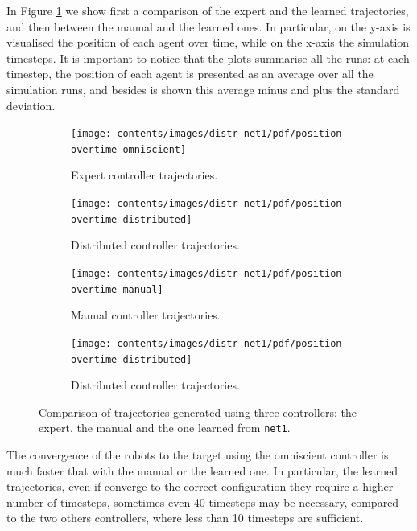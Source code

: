 In Figure \ref{fig:net1traj} we show first a comparison of the expert and the 
learned trajectories, and then between the manual and the learned ones. In 
particular, on the y-axis is visualised the position of each agent over time, while 
on the x-axis the simulation timesteps. It is important to notice that the plots 
summarise all the runs: at each timestep, the position of each agent is presented 
as an average over all the simulation runs, and besides is shown this average 
minus and plus the standard deviation.
\begin{figure}[!htb]
	\centering
	\begin{subfigure}[h]{0.49\textwidth}
		\centering
		\texttt{[image: contents/images/distr-net1/pdf/position-overtime-omniscient]}%
		\caption{Expert controller trajectories.}
	\end{subfigure}
	\hfill
	\begin{subfigure}[h]{0.49\textwidth}
		\centering
		\texttt{[image: contents/images/distr-net1/pdf/position-overtime-distributed]}
		\caption{Distributed controller trajectories.}
	\end{subfigure}
	\hspace*{\fill}%
	
	\vspace*{8pt}%
	
	\hspace*{\fill}%
	\begin{subfigure}[h]{0.49\textwidth}
		\centering
		\texttt{[image: contents/images/distr-net1/pdf/position-overtime-manual]}%
		\caption{Manual controller trajectories.}
	\end{subfigure}
	\hfill
	\begin{subfigure}[h]{0.49\textwidth}
		\centering
		\texttt{[image: contents/images/distr-net1/pdf/position-overtime-distributed]}
		\caption{Distributed controller trajectories.}
	\end{subfigure}
	\caption[Evaluation of the trajectories learned by \texttt{net1}.]{Comparison 
		of trajectories generated using three controllers: the expert, the manual and 
		the one learned from \texttt{net1}.}
	\label{fig:net1traj}
\end{figure}

The convergence of the robots to the target using the omniscient controller is 
much faster that with the manual or the learned one. In particular, the 
learned trajectories, even if converge to the correct configuration they require a 
higher number of timesteps, sometimes even 40 timesteps may be necessary, 
compared to the two others controllers, where less than 10 timesteps are 
sufficient.

